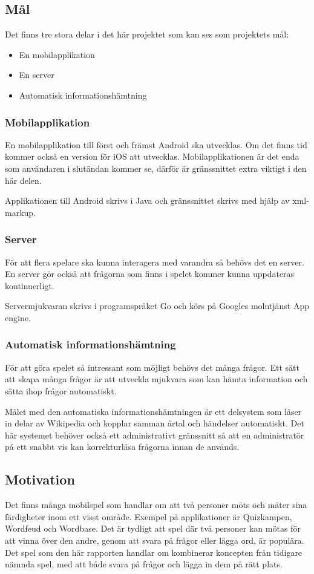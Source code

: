 \documentclass[swedish,12pt,a4paper]{article}
\begin{document}
\subsection{Mål}
Det finns tre stora delar i det här projektet som kan ses som projektets mål:
\begin{itemize}
\item En mobilapplikation
\item En server
\item Automatisk informationshämtning
\end{itemize}

\subsubsection{Mobilapplikation}
En mobilapplikation till först och främst Android ska utvecklas. Om det finns tid kommer också en version för iOS att utvecklas. Mobilapplikationen är det enda som användaren i slutändan kommer se, därför är gränssnittet extra viktigt i den här delen. 

Applikationen till Android skrivs i Java och gränssnittet skrivs med hjälp av xml-markup.

\subsubsection{Server}
För att flera spelare ska kunna interagera med varandra så behövs det en server. En server gör också att frågorna som finns i spelet kommer kunna uppdateras kontinuerligt.

Servermjukvaran skrivs i programspråket Go och körs på Googles molntjänst App engine.

\subsubsection{Automatisk informationshämtning}
För att göra spelet så intressant som möjligt behövs det många frågor. Ett sätt att skapa många frågor är att utveckla mjukvara som kan hämta information och sätta ihop frågor automatiskt. 

Målet med den automatiska informationshämtningen är ett delsystem som läser in delar av Wikipedia och kopplar samman årtal och händelser automatiskt. Det här systemet behöver också ett administrativt gränssnitt så att en administratör på ett snabbt vis kan korrekturläsa frågorna innan de används.

\subsection{Motivation}
Det finns många mobilspel som handlar om att två personer möts och mäter sina färdigheter inom ett visst område. Exempel på applikationer är Quizkampen, Wordfeud och Wordbase. Det är tydligt att spel där två personer kan mötas för att vinna över den andre, genom att svara på frågor eller lägga ord, är populära. Det spel som den här rapporten handlar om kombinerar koncepten från tidigare nämnda spel, med att både svara på frågor och lägga in dem på rätt plats. 
\end{document}
